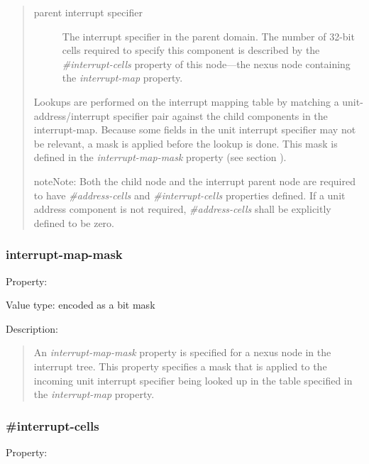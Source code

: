 \documentclass[a4paper,10pt,oneside]{sphinxmanual}
\begin{document}
\begin{quote}
\begin{description}
\item[{parent interrupt specifier}] \leavevmode
The interrupt specifier in the parent domain. The number of 32-bit
cells required to specify this component is described by the
\emph{\#interrupt-cells} property of this node—the nexus node containing
the \emph{interrupt-map} property.

\end{description}

Lookups are performed on the interrupt mapping table by matching a
unit-address/interrupt specifier pair against the child components in
the interrupt-map. Because some fields in the unit interrupt specifier
may not be relevant, a mask is applied before the lookup is done. This
mask is defined in the \emph{interrupt-map-mask} property (see section
{\hyperref[devicetree\string-basics:sect\string-interrupt\string-map\string-mask]{}}).

\begin{notice}{note}{Note:}
Both the child node and the interrupt parent node are required to
have \emph{\#address-cells} and \emph{\#interrupt-cells} properties defined. If a
unit address component is not required, \emph{\#address-cells} shall be
explicitly defined to be zero.
\end{notice}
\end{quote}


\subsubsection{interrupt-map-mask}
\label{devicetree-basics:sect-interrupt-map-mask}\label{devicetree-basics:interrupt-map-mask}
Property: 

Value type:  encoded as a bit mask

Description:
\begin{quote}

An \emph{interrupt-map-mask} property is specified for a nexus node in the
interrupt tree. This property specifies a mask that is applied to the
incoming unit interrupt specifier being looked up in the table specified
in the \emph{interrupt-map} property.
\end{quote}


\subsubsection{\#interrupt-cells}
\label{devicetree-basics:id2}
Property: 
\end{document}
